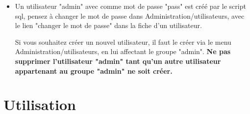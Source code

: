 \documentclass[12pt,a4paper]{report}
\begin{document}
\begin{itemize}
\item Un utilisateur "admin" avec comme mot de passe "pass" est créé par le script sql, pensez à changer le mot de passe dans Administration/utilisateurs, avec le lien "changer le mot de passe" dans la fiche d'un utilisateur.

Si vous souhaitez créer un nouvel utilisateur, il faut le créer via le menu Administration/utilisateurs, en lui affectant le groupe "admin". 
\textbf{Ne pas supprimer l'utilisateur "admin" tant qu'un autre utilisateur appartenant au groupe "admin" ne soit créer.}

\end{itemize}



\chapter{Utilisation}
\end{document}
